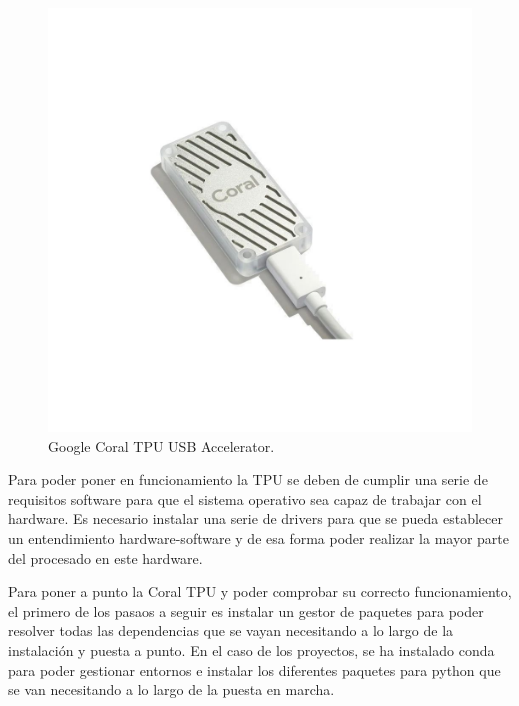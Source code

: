 \begin{figure}[h]
    \centering
    \includegraphics[scale=0.5]{fig/google_coral_usb_accelerator_1.jpg}
    \caption{Google Coral TPU USB Accelerator.}
    \label{fig:mesh1}
\end{figure}

Para poder poner en funcionamiento la TPU se deben de cumplir una serie de requisitos software para que el sistema operativo sea capaz de trabajar con el hardware. Es necesario instalar una serie de drivers para que se pueda establecer un entendimiento hardware-software y de esa forma poder realizar la mayor parte del procesado en este hardware.

Para poner a punto la Coral TPU y poder comprobar su correcto funcionamiento, el primero de los pasaos a seguir es instalar un gestor de paquetes para poder resolver todas las dependencias que se vayan necesitando a lo largo de la instalación y puesta a punto. En el caso de los proyectos, se ha instalado conda para poder gestionar entornos e instalar los diferentes paquetes para python que se van necesitando a lo largo de la puesta en marcha. 

